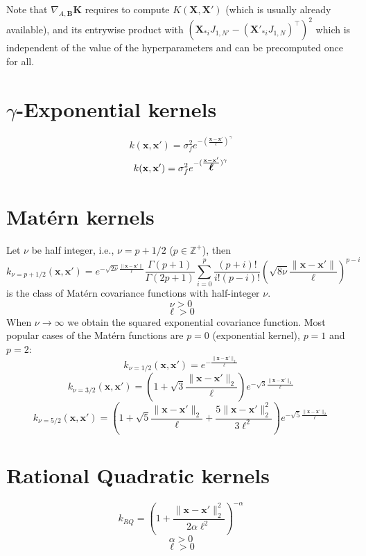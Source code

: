 \documentclass[a4paper,11pt]{article}
\newcommand\x{{\mathbf x}}
\newcommand\X{{\mathbf X}}
\newcommand\K{{\mathbf K}}
\newcommand\ELL{{\Ivec \ell}}
\newcommand{\Ivec}[1]{\mbox{\boldmath $#1$}}
\begin{document}
Note that $\nabla_{A,\mathbf{B}} \K$ requires to compute $K(\X,\X')$
(which is usually already available), and its entrywise product with
$(\X_{*i}J_{1,N'}- (\X'_{*i}J_{1,N})^{\top})^2$ which is independent
of the value of the hyperparameters and can be precomputed once for
all.

\section{$\gamma$-Exponential kernels}
$$k(\x,\x') = \sigma_f^2 e^{-(\frac{\x-\x'}{\ell})^\gamma}$$
$$k(\x,\x') = \sigma_f^2 e^{-(\frac{\x-\x'}{\ELL})^\gamma}$$

\section{Mat\'ern kernels}
Let $\nu$ be half integer, i.e., $\nu = p + 1/2$ ($p \in
\mathbb{Z}^+$), then
$$k_{\nu=p+1/2}(\x,\x') = e^{-\sqrt{2\nu}\frac{\|\x-\x'\|}{\ell}}
\frac{\Gamma(p+1)}{\Gamma(2p+1)} \sum_{i=0}^p
\frac{(p+i)!}{i!(p-i)!}\left(\sqrt{8\nu}\frac{\|\x-\x'\|}{\ell}\right)^{p-i}$$
is the class of Mat\'ern covariance functions with half-integer $\nu$.
$$\nu > 0$$
$$\ell > 0$$
When $\nu \rightarrow \infty$ we obtain the squared exponential
covariance function. Most popular cases of the Mat\'ern functions are
$p=0$ (exponential kernel), $p=1$ and $p=2$:
$$k_{\nu=1/2}(\x,\x') = e^{-\frac{\|\x-\x'\|_2}{\ell}}$$
$$k_{\nu=3/2}(\x,\x') = \left(1+\sqrt{3}\frac{\|\x-\x'\|_2}{\ell}
\right) e^{-\sqrt{3}\frac{\|\x-\x'\|_2}{\ell}}$$ 
$$k_{\nu=5/2}(\x,\x') = \left(1+\sqrt{5}\frac{\|\x-\x'\|_2}{\ell}
 + \frac{5\|\x-\x'\|_2^2}{3\ell^2}\right)
e^{-\sqrt{5}\frac{\|\x-\x'\|_2}{\ell}}$$


\section{Rational Quadratic kernels}
$$k_{RQ} = \left(1+\frac{\|\x-\x'\|_2^2}{2\alpha\ell^2}
\right)^{-\alpha}$$
$$\alpha > 0$$
$$\ell > 0$$
\end{document}
